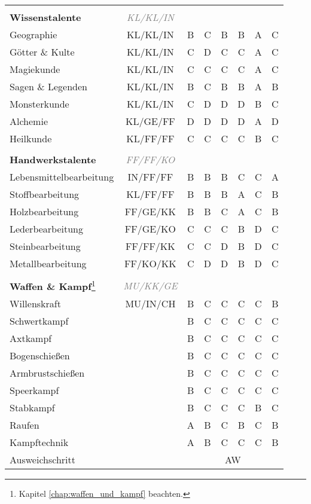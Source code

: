 \begin{center}
\begin{longtable}{|l|c|c|c|c|c|c|c|}
\hline
\multicolumn{8}{|l|}{} \\
\multicolumn{1}{|l}{\textbf{Wissenstalente}} & \multicolumn{1}{c}{\textcolor{gray}{\textit{KL/KL/IN}}} & \multicolumn{6}{r|}{} \\
\hline
Geographie & KL/KL/IN & B & C & B & B & A & C \\
\hline
Götter \& Kulte & KL/KL/IN & C & D & C & C & A & C \\
\hline
Magiekunde\footnotemark[1] & KL/KL/IN & C & C & C & C & A & C \\
\hline
Sagen \& Legenden & KL/KL/IN & B & C & B & B & A & B \\
\hline
Monsterkunde & KL/KL/IN & C & D & D & D & B & C \\
\hline
Alchemie & KL/GE/FF & D & D & D & D & A & D \\
\hline
Heilkunde & KL/FF/FF & C & C & C & C & B & C \\
 

\hline
\multicolumn{8}{|l|}{} \\
\multicolumn{1}{|l}{\textbf{Handwerkstalente}} & \multicolumn{1}{c}{\textcolor{gray}{\textit{FF/FF/KO}}} & \multicolumn{6}{r|}{} \\
\hline
Lebensmittelbearbeitung & IN/FF/FF & B & B & B & C & C & A \\
\hline
Stoffbearbeitung & KL/FF/FF & B & B & B & A & C & B \\
\hline
Holzbearbeitung & FF/GE/KK & B & B & C & A & C & B \\
\hline
Lederbearbeitung\footnotemark[1] & FF/GE/KO & C & C & C & B & D & C \\
\hline
Steinbearbeitung\footnotemark[1] & FF/FF/KK & C & C & D & B & D & C \\
\hline
Metallbearbeitung\footnotemark[1] & FF/KO/KK & C & D & D & B & D & C \\
 

\hline
\multicolumn{8}{|l|}{} \\
\multicolumn{1}{|l}{\textbf{Waffen \& Kampf}\footnote{Kapitel \ref{chap:waffen_und_kampf} beachten.}} & \multicolumn{1}{c}{\textcolor{gray}{\textit{MU/KK/GE}}} & \multicolumn{6}{r|}{} \\
\hline
Willenskraft\footnotemark[3] & MU/IN/CH & B & C & C & C & C & B \\
\hline
Schwertkampf & & B & C & C & C & C & C \\
\hline
Axtkampf & & B & C & C & C & C & C \\
\hline
Bogenschießen & & B & C & C & C & C & C \\
\hline
Armbrustschießen & & B & C & C & C & C & C \\
\hline
Speerkampf & & B & C & C & C & C & C \\
\hline
Stabkampf\footnotemark[3] & & B & C & C & C & B & C \\
\hline
Raufen\footnotemark[3] & & A & B & C & B & C & B \\
\hline
Kampftechnik\footnotemark[3] & & A & B & C & C & C & B \\
\hline
Ausweichschritt\footnotemark[3] & & \multicolumn{6}{c|}{AW} \\


\end{longtable}
\end{center}

